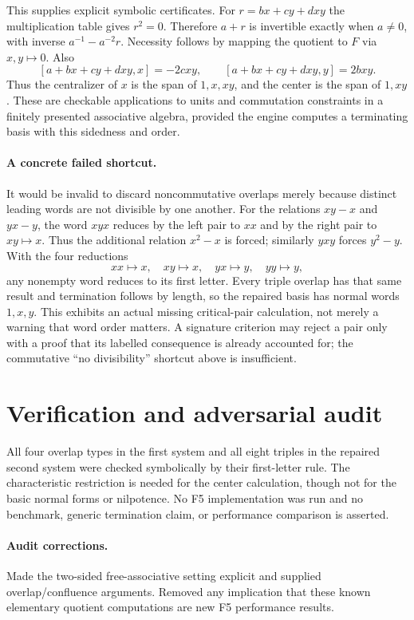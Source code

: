 \documentclass[11pt]{article}
\begin{document}
This supplies explicit symbolic certificates. For $r=bx+cy+dxy$ the multiplication table gives $r^2=0$. Therefore $a+r$ is invertible exactly when $a\ne0$, with inverse $a^{-1}-a^{-2}r$. Necessity follows by mapping the quotient to $F$ via $x,y\mapsto0$. Also
\[
 [a+bx+cy+dxy,x]=-2cxy,\qquad
 [a+bx+cy+dxy,y]=2bxy.
\]
Thus the centralizer of $x$ is the span of $1,x,xy$, and the center is the span of $1,xy$. These are checkable applications to units and commutation constraints in a finitely presented associative algebra, provided the engine computes a terminating basis with this sidedness and order.

\paragraph{A concrete failed shortcut.}
It would be invalid to discard noncommutative overlaps merely because distinct leading words are not divisible by one another. For the relations $xy-x$ and $yx-y$, the word $xyx$ reduces by the left pair to $xx$ and by the right pair to $xy\mapsto x$. Thus the additional relation $x^2-x$ is forced; similarly $yxy$ forces $y^2-y$. With the four reductions
\[
 xx\mapsto x,\quad xy\mapsto x,\quad yx\mapsto y,\quad yy\mapsto y,
\]
any nonempty word reduces to its first letter. Every triple overlap has that same result and termination follows by length, so the repaired basis has normal words $1,x,y$. This exhibits an actual missing critical-pair calculation, not merely a warning that word order matters. A signature criterion may reject a pair only with a proof that its labelled consequence is already accounted for; the commutative ``no divisibility'' shortcut above is insufficient.
\section{Verification and adversarial audit}
All four overlap types in the first system and all eight triples in the repaired second system were checked symbolically by their first-letter rule. The characteristic restriction is needed for the center calculation, though not for the basic normal forms or nilpotence. No F5 implementation was run and no benchmark, generic termination claim, or performance comparison is asserted.
\paragraph{Audit corrections.} Made the two-sided free-associative setting explicit and supplied overlap/confluence arguments. Removed any implication that these known elementary quotient computations are new F5 performance results.
\end{document}
